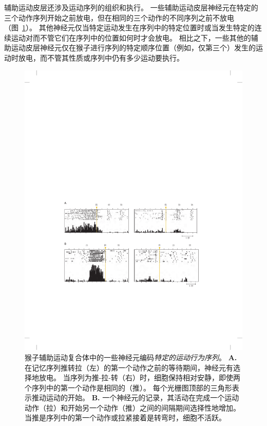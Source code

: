 辅助运动皮层还涉及运动序列的组织和执行。
一些辅助运动皮层神经元在特定的三个动作序列开始之前放电，但在相同的三个动作的不同序列之前不放电（图~\ref{fig:34_7}）。
其他神经元仅当特定运动发生在序列中的特定位置时或当发生特定的连续运动对而不管它们在序列中的位置如何时才会放电。
相比之下，一些其他的辅助运动皮层神经元仅在猴子进行序列的特定顺序位置（例如，仅第三个）发生的运动时放电，而不管其性质或序列中仍有多少运动要执行。


\begin{figure}[htbp]
	\centering
	\includegraphics[width=1.0\linewidth]{chap34/fig_34_7}
	\caption{猴子辅助运动复合体中的一些神经元编码\textit{特定的运动行为序列}\cite{tanji2001sequential}。
		\textbf{A.} 在记忆序列推转拉（左）的第一个动作之前的等待期间，神经元有选择地放电。
		当序列为推-拉-转（右）时，细胞保持相对安静，即使两个序列中的第一个动作是相同的（推）。
		每个光栅图顶部的三角形表示推动运动的开始。
		\textbf{B.} 一个神经元的记录，其活动在完成一个运动动作（拉）和开始另一个动作（推）之间的间隔期间选择性地增加。
		当推是序列中的第一个动作或拉紧接着是转弯时，细胞不活跃。}
	\label{fig:34_7}
\end{figure}


